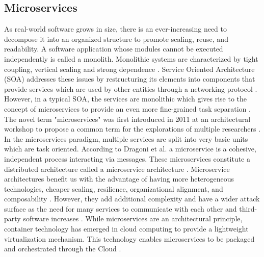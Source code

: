\subsection{Microservices}
\label{chap:microservices}

As real-world software grows in size, there is an ever-increasing need to decompose it into an organized structure to promote scaling, reuse, and readability. A software application whose modules cannot be executed independently is called a monolith. Monolithic systems  are characterized by tight coupling, vertical scaling and strong dependence \cite{microservicesfrowler}. Service Oriented Architecture (SOA) addresses these issues by restructuring its elements into components that provide services which are used by other entities through a networking protocol \cite{papazoglou2003service}. However, in a typical SOA, the services are monolithic which gives rise to the concept of microservices  to provide an even more fine-grained task separation \cite{ahmadvand2016requirements}. The novel term "microservices" was first introduced in 2011 at an architectural workshop to propose a common term for the explorations of multiple researchers \cite{dragoni2017microservices, microservicesfrowler}. In the microservices paradigm, multiple services are split into very basic units which are task oriented. According to Dragoni et al. a microservice is a cohesive, independent process interacting via messages. These microservices constitute a distributed architecture called a microservice architecture \cite{dragoni2017microservices}. Microservice architectures benefit us with the advantage of having more heterogeneous technologies, cheaper scaling, resilience, organizational alignment, and composability \cite{newman2015building}. However, they add additional complexity and have a wider attack surface as the need for many services to communicate with each other and third-party software increases \cite{combe2016docker, dragoni2017microservices}. While microservices are an architectural principle, container technology has emerged in cloud computing to provide a lightweight virtualization mechanism. This technology enables microservices to be packaged and orchestrated through the Cloud \cite{pahl2016microservices}.


